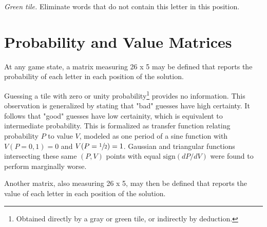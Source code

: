 \documentclass[twocolumn]{tudelft-aiaa}
\begin{document}
\emph{Green tile.} Eliminate words that do not contain this letter in this position.

\section{Probability and Value Matrices}

At any game state, a matrix measuring 26 x 5 may be defined that reports the probability of each letter in each position of the solution.

Guessing a tile with zero or unity probability\footnote{Obtained directly by a gray or green tile, or indirectly by deduction.} provides no information. This observation is generalized by stating that "bad" guesses have high certainty. It follows that "good" guesses have low certainity, which is equivalent to intermediate probability. This is formalized as transfer function relating probability $P$ to value $V$, modeled as one period of a sine function with $V(P=0,1)=0$ and $V(P=\sfrac{1}{2})=1$. Gaussian and triangular functions intersecting these same $(P,V)$ points with equal $\text{sign}(dP/dV)$ were found to perform marginally worse.

Another matrix, also measuring 26 x 5, may then be defined that reports the value of each letter in each position of the solution.
\end{document}
